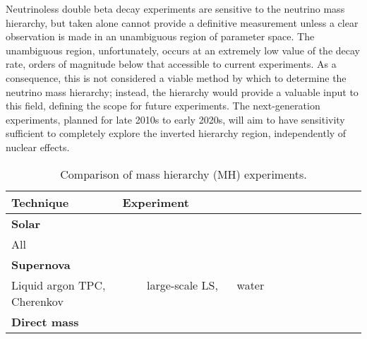 Neutrinoless double beta decay experiments are sensitive to the
neutrino mass hierarchy, but taken alone cannot provide a definitive
measurement unless a clear observation is made in an unambiguous
region of parameter space. The unambiguous region, unfortunately,
occurs at an extremely low value of the decay rate, orders of
magnitude below that accessible to current experiments.  As a
consequence, this is not considered a viable method by which to
determine the neutrino mass hierarchy; instead, the hierarchy would
provide a valuable input to this field, defining the scope for future
experiments. The next-generation experiments, planned for late 2010s
to early 2020s, will aim to have sensitivity sufficient to completely
explore the inverted hierarchy region, independently of nuclear
effects. 

\begin{table}[!htdp]
\begin{center}
\caption{Comparison of mass hierarchy (MH) experiments. \label{t:MH1}}
\begin{tabular}{ p{3.5cm }p{3cm }p{}p{4cm}p{0cm}}
\hline \hline
{\bf Technique} $\qquad\qquad$ Experiment  & \centering{MH sensitivity} & \centering{Timescale for results}    &  \centering{Major concerns} &  \\
\hline 
\bf Solar \\
All   & \centering{Zero} & \centering{Ongoing}  &  \centering{No sensitivity to sign of $\Delta m^2_{32}$} &\\
\hline
\bf Supernova \\
 Liquid argon TPC, $\quad\quad\quad$ large-scale LS, $\quad$ water Cherenkov & \centering{Model dependent} & \centering{Unpredictable}  & \centering{ Unpredictable timescale, astrophysical uncertainties} & \\
\hline
\bf Direct mass \\

\end{tabular}
\end{center}
\end{table}
